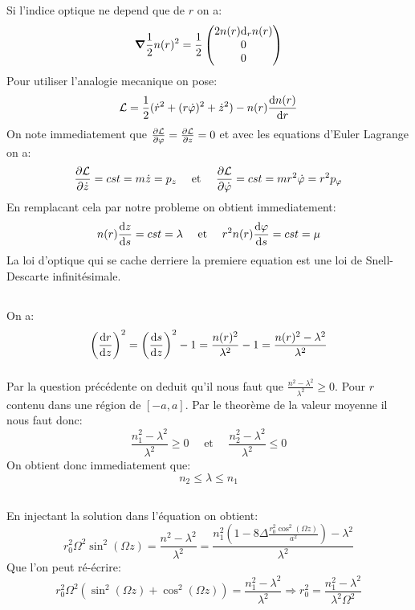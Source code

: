 \documentclass[10pt,a4paper]{article}
\begin{document}
\subsection{}
Si l'indice optique ne depend que de $r$ on a:
\[
\grad \frac{1}{2}n(r)^2 = \frac{1}{2}\begin{pmatrix}
2 n(r) \dd_r n(r)\\
0\\
0
\end{pmatrix}
\]
Pour utiliser l'analogie mecanique on pose:
\[
\mathcal{L} = \frac{1}{2}(\dot{r}^2 + (r\dot{\varphi})^2 + \dot{z}^2) - n(r) \dv{n(r)}{r}
\]
On note immediatement que $\pdv{\mathcal{L}}{\varphi} = \pdv{\mathcal{L}}{z} = 0$ et avec les equations d'Euler Lagrange on a:
\[
\pdv{\mathcal{L}}{\dot{z}} = cst = m \dot{z} = p_z \quad \text{ et } \quad \pdv{\mathcal{L}}{\dot{\varphi}} = cst = m r^2 \dot{\varphi} = r^2 p_\varphi
\]
En remplacant cela par notre probleme on obtient immediatement:
\[
n(r) \dv{z}{s} = cst = \lambda \quad \text{ et } \quad r^2 n(r) \dv{\varphi}{s} = cst = \mu
\]
La loi d'optique qui se cache derriere la premiere equation est une loi de Snell-Descarte infinitésimale.

\subsection{}
\subsubsection{}
On a:
\[
\left(\dv{r}{z}\right)^2 = \left(\dv{s}{z}\right)^2 - 1 = \frac{n(r)^2}{\lambda^2} - 1 = \frac{n(r)^2 - \lambda^2}{\lambda^2}
\]
\subsubsection{}
Par la question précédente on deduit qu'il nous faut que $\frac{n^2 - \lambda^2}{\lambda^2} \geq 0$. Pour $r$ contenu dans une région de $[-a, a]$. Par le theorème de la valeur moyenne il nous faut donc:
\[
\frac{n_1^2 - \lambda^2}{\lambda^2} \geq 0 \quad \text{ et } \quad \frac{n_2^2 - \lambda^2}{\lambda^2} \leq 0 
\] 
On obtient donc immediatement que:
\[
n_2 \leq \lambda \leq n_1
\]
\subsection{}
En injectant la solution dans l'équation on obtient:
\[
r_0^2 \Omega^2 \sin^2(\Omega z) = \frac{n^2 - \lambda^2}{\lambda^2} = \frac{n_1^2 (1 - 8 \Delta \frac{r_0^2 \cos^2 (\Omega z)}{a^2}) - \lambda^2}{\lambda^2}
\]
Que l'on peut ré-écrire:
\[
r_0^2 \Omega^2(\sin^2 (\Omega z) + \cos^2 (\Omega z)) = \frac{n_1^2 - \lambda^2}{\lambda^2} \Rightarrow r_0^2 = \frac{n_1^2 - \lambda^2}{\lambda^2 \Omega^2}
\]
\end{document}
